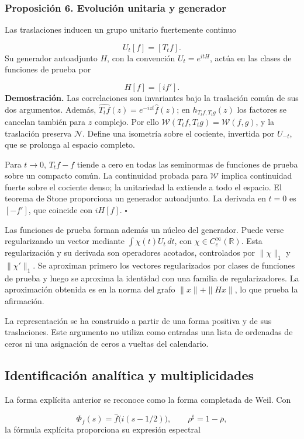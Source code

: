 \subsubsection*{Proposición 6. Evolución unitaria y generador}
Las traslaciones inducen un grupo unitario fuertemente continuo

\[
U_t[f]=[T_tf].
\]
Su generador autoadjunto \(H\), con la convención \(U_t=e^{itH}\), actúa en las clases de funciones de prueba por

\[
H[f]=[i f'].
\]
\textbf{Demostración.} Las correlaciones son invariantes bajo la traslación común de sus dos argumentos. Además, \(\widehat{T_tf}(z)=e^{-izt}\widehat f(z)\); en \(h_{T_tf,T_tg}(z)\) los factores se cancelan también para \(z\) complejo. Por ello \(\mathscr W(T_tf,T_tg)=\mathscr W(f,g)\), y la traslación preserva \(\mathcal N\). Define una isometría sobre el cociente, invertida por \(U_{-t}\), que se prolonga al espacio completo.

Para \(t\to0\), \(T_tf-f\) tiende a cero en todas las seminormas de funciones de prueba sobre un compacto común. La continuidad probada para \(\mathscr W\) implica continuidad fuerte sobre el cociente denso; la unitariedad la extiende a todo el espacio. El teorema de Stone proporciona un generador autoadjunto. La derivada en \(t=0\) es \([-f']\), que coincide con \(iH[f]\). \hfill\(\square\)

Las funciones de prueba forman además un núcleo del generador. Puede verse regularizando un vector mediante \(\int\chi(t)U_t\,dt\), con \(\chi\in C_c^\infty(\mathbb R)\). Esta regularización y su derivada son operadores acotados, controlados por \(\|\chi\|_1\) y \(\|\chi'\|_1\). Se aproximan primero los vectores regularizados por clases de funciones de prueba y luego se aproxima la identidad con una familia de regularizadores. La aproximación obtenida es en la norma del grafo \(\|x\|+\|Hx\|\), lo que prueba la afirmación.

La representación se ha construido a partir de una forma positiva y de sus traslaciones. Este argumento no utiliza como entradas una lista de ordenadas de ceros ni una asignación de ceros a vueltas del calendario.

\subsection{Identificación analítica y multiplicidades}
La forma explícita anterior se reconoce como la forma completada de Weil. Con

\[
\Phi_f(s)=\widehat f\bigl(i(s-1/2)\bigr),
\qquad \rho^\sharp=1-\overline\rho,
\]
la fórmula explícita proporciona su expresión espectral

